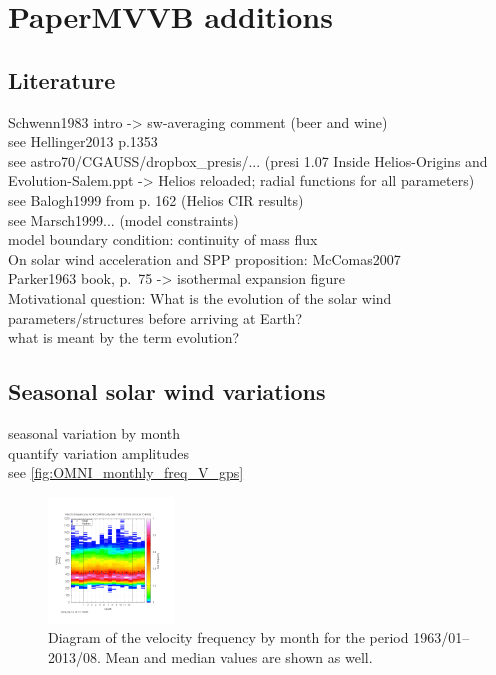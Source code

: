 
\chapter{PaperMVVB additions}



\section{Literature}
Schwenn1983 intro -> sw-averaging comment (beer and wine)\\
see Hellinger2013 p.1353\\
see astro70/CGAUSS/dropbox\_presis/... (presi 1.07 Inside Helios-Origins and Evolution-Salem.ppt -> Helios reloaded; radial functions for all parameters)\\
see Balogh1999 from p. 162 (Helios CIR results)\\
see Marsch1999... (model constraints)\\
model boundary condition: continuity of mass flux\\
On solar wind acceleration and SPP proposition: McComas2007\\
Parker1963 book, p.~75 -> isothermal expansion figure\\	%

Motivational question: What is the evolution of the solar wind parameters/structures before arriving at Earth?\\
what is meant by the term evolution?\\


\section{Seasonal solar wind variations}
seasonal variation by month\\
quantify variation amplitudes\\

see \autoref{fig:OMNI_monthly_freq_V_gps}
\begin{figure}[htb]
	\centering
	\includegraphics[width=0.3\textwidth]{images/gnuplots/OMNI_monthly_freq_V_gps.png}
	\caption{Diagram of the velocity frequency by month for the period 1963/01--2013/08. Mean and median values are shown as well.}
	\label{fig:OMNI_monthly_freq_V_gps}
\end{figure}

